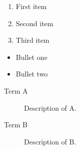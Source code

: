 

\begin{enumerate}
\item First item
\item Second item
\item Third item
\end{enumerate}

\begin{itemize}
\item Bullet one
\item Bullet two
\end{itemize}

\begin{description}
\item[Term A] Description of A.
\item[Term B] Description of B.
\end{description}


